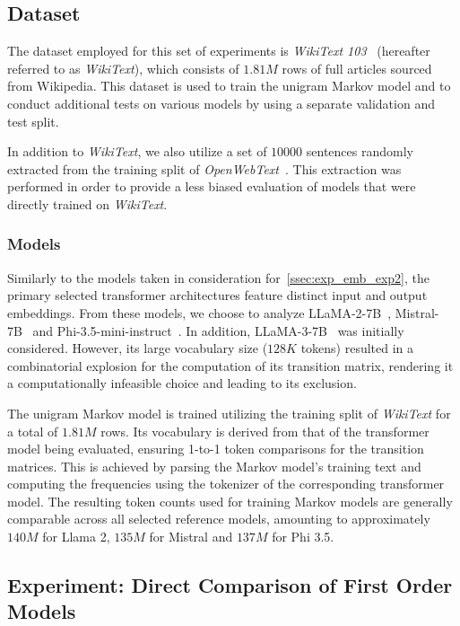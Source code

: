 \subsection{Dataset}\label{ssec:exp_fom_dataset}

The dataset employed for this set of experiments is \emph{WikiText 103}~\cite{merity2017} (hereafter referred to as \emph{WikiText}), which consists of $1.81M$ rows of full articles sourced from Wikipedia.
This dataset is used to train the unigram Markov model and to conduct additional tests on various models by using a separate validation and test split.

In addition to \emph{WikiText}, we also utilize a set of $10000$ sentences randomly extracted from the training split of \emph{OpenWebText}~\cite{gokaslan2019}.
This extraction was performed in order to provide a less biased evaluation of models that were directly trained on \emph{WikiText}.

\subsubsection{Models}

Similarly to the models taken in consideration for~\cref{ssec:exp_emb_exp2}, the primary selected transformer architectures feature distinct input and output embeddings.
From these models, we choose to analyze LLaMA-2-7B~\cite{touvron2023}, Mistral-7B~\cite{jiang2023} and Phi-3.5-mini-instruct~\cite{abdin2024}.
In addition, LLaMA-3-7B~\cite{dubey2024} was initially considered.
However, its large vocabulary size ($128K$ tokens) resulted in a combinatorial explosion for the computation of its transition matrix, rendering it a computationally infeasible choice and leading to its exclusion.

The unigram Markov model is trained utilizing the training split of \emph{WikiText} for a total of $1.81M$ rows.
Its vocabulary is derived from that of the transformer model being evaluated, ensuring 1-to-1 token comparisons for the transition matrices.
This is achieved by parsing the Markov model's training text and computing the frequencies using the tokenizer of the corresponding transformer model.
The resulting token counts used for training Markov models are generally comparable across all selected reference models, amounting to approximately $140M$ for Llama 2, $135M$ for Mistral and $137M$ for Phi 3.5.

\subsection{Experiment: Direct Comparison of First \texorpdfstring{\linebreak}{} Order Models}\label{ssec:exp_fom_exp1}

